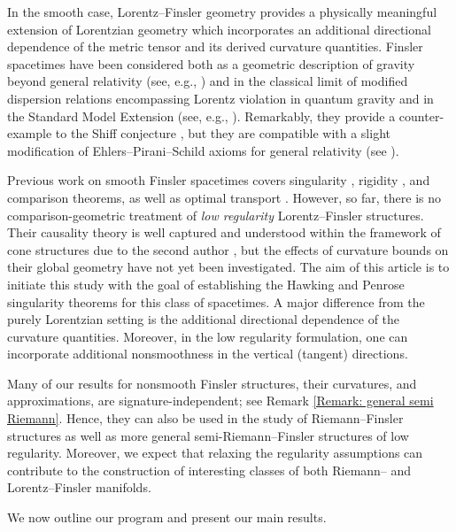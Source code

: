 \documentclass[a4paper,11pt]{article}
\numberwithin{equation}{section}
\theoremstyle{definition}
\theoremstyle{plain}
\begin{document}
In the smooth case, Lorentz--Finsler geometry provides a physically meaningful extension of Lorentzian geometry which incorporates an additional directional dependence of the metric tensor and its derived curvature quantities. 
Finsler spacetimes have been considered both as a 
geometric description of gravity beyond general relativity (see, e.g., \cite{BeJaSa20, KoStSt09, Pfeife19}) and in the classical limit of modified dispersion relations
encompassing Lorentz violation in quantum gravity and in the Standard Model Extension (see, e.g., \cite{GiLiSi06, Vacaru11, Kostel11, KoRuTs12, Russel15, Collad17}). 
Remarkably, they provide a counter-example to the Shiff conjecture \cite{LaPeHa12}, but they are compatible with a slight modification of Ehlers--Pirani--Schild axioms for general relativity (see \cite{LaePer18, BeJaSa20}). 

Previous work on smooth Finsler spacetimes covers singularity \cite{MinguzziRaychaudhuri, AJ16, LuMinguzziOhtaSingularity}, rigidity \cite{LuMinguzziOhtaSplitting, CaponioOhanyanOhta}, and comparison \cite{LuMinguzziOhtaComparison} theorems, as well as optimal transport \cite{BraunOhta}.
However, so far, there is no comparison-geometric treatment of \emph{low regularity} Lorentz--Finsler structures. Their causality theory is well captured and understood within the framework of cone structures due to the second author \cite{Minguzziconestructure}, but the effects of curvature bounds on their global geometry have not yet been investigated. 
The aim of this article is to initiate this study with the goal of establishing the Hawking and Penrose singularity theorems for this class of spacetimes.
A major difference from the purely Lorentzian setting is the additional directional dependence of the curvature quantities. 
Moreover, in the low regularity formulation, one can incorporate additional nonsmoothness in the vertical (tangent) directions. 

Many of our results for nonsmooth Finsler structures, their curvatures, and approximations, are signature-independent; see Remark \ref{Remark: general semi Riemann}. 
Hence, they can also be used in the study of Riemann--Finsler structures as well as more general semi-Riemann--Finsler structures of low regularity. 
Moreover, we expect that relaxing the regularity assumptions can contribute to the construction of interesting classes of both Riemann-- and Lorentz--Finsler manifolds.

We now outline our program and present our main results.
\end{document}
